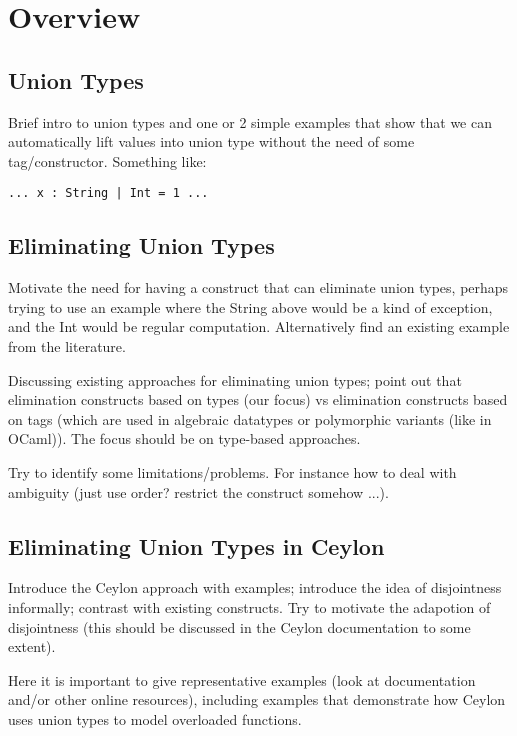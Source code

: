 \section{Overview}
\label{sec:overview}


\subsection{Union Types}

Brief intro to union types and one or 2 simple examples that show that we
can automatically lift values into union type without the need of some
tag/constructor. Something like:

\begin{verbatim}
... x : String | Int = 1 ...
\end{verbatim}

\subsection{Eliminating Union Types}

Motivate the need for having a construct that can eliminate union types,
perhaps trying to use an example where the String above would be a kind
of exception, and the Int would be regular computation. Alternatively
find an existing example from the literature. 

Discussing existing approaches for eliminating union types;
point out that elimination constructs based on types (our focus) vs
elimination constructs based on tags (which are used in algebraic
datatypes or polymorphic variants (like in OCaml)).
The focus should be on type-based approaches.

Try to identify some limitations/problems. For instance how to deal
with ambiguity (just use order? restrict the construct somehow ...).

\subsection{Eliminating Union Types in Ceylon}

Introduce the Ceylon approach with examples; introduce the idea of
disjointness informally; contrast with existing constructs.
Try to motivate the adapotion of disjointness (this should be discussed
in the Ceylon documentation to some extent).

Here it is important to give representative examples (look at documentation
and/or other online resources), including examples
that demonstrate how Ceylon uses union types to model overloaded functions. 

